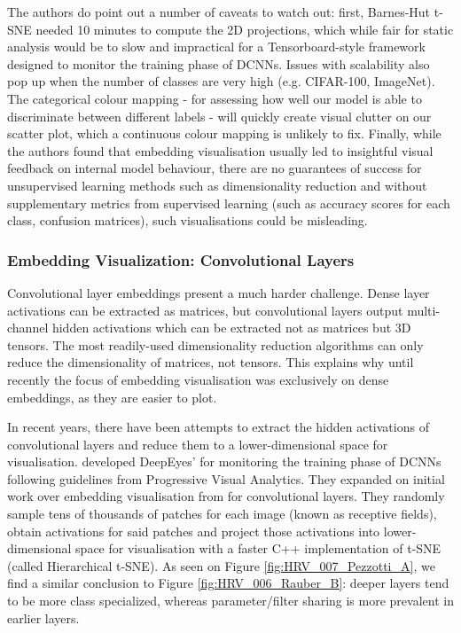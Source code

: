 The authors do point out a number of caveats to watch out: first, Barnes-Hut t-SNE needed 10 minutes to compute the 2D projections, which while fair for static analysis would be to slow and impractical for a Tensorboard-style framework designed to monitor the training phase of DCNNs. Issues with scalability also pop up when the number of classes are very high (e.g. CIFAR-100, ImageNet). The categorical colour mapping - for assessing how well our model is able to discriminate between different labels - will quickly create visual clutter on our scatter plot, which a continuous colour mapping is unlikely to fix. Finally, while the authors found that embedding visualisation usually led to insightful visual feedback on internal model behaviour, there are no guarantees of success for unsupervised learning methods such as dimensionality reduction and without supplementary metrics from supervised learning (such as accuracy scores for each class, confusion matrices), such visualisations could be misleading.

\subsubsection{Embedding Visualization: Convolutional Layers}
\label{embeddings-convolutional}

Convolutional layer embeddings present a much harder challenge. Dense layer activations can be extracted as matrices, but convolutional layers output multi-channel hidden activations which can be extracted not as matrices but 3D tensors. The most readily-used dimensionality reduction algorithms can only reduce the dimensionality of matrices, not tensors. This explains why until recently the focus of embedding visualisation was exclusively on dense embeddings, as they are easier to plot.

In recent years, there have been attempts to extract the hidden activations of convolutional layers and reduce them to a lower-dimensional space for visualisation. \cite{Pezzotti2018DeepEyesPV} developed DeepEyes' for monitoring the training phase of DCNNs following guidelines from Progressive Visual Analytics. They expanded on initial work over embedding visualisation from \cite{Rauber2017VisualizingTH} for convolutional layers. They randomly sample tens of thousands of patches for each image (known as receptive fields), obtain activations for said patches and project those activations into lower-dimensional space for visualisation with a faster C++ implementation of t-SNE (called Hierarchical t-SNE). As seen on Figure \ref{fig:HRV_007_Pezzotti_A}, we find a similar conclusion to Figure \ref{fig:HRV_006_Rauber_B}: deeper layers tend to be more class specialized, whereas parameter/filter sharing is more prevalent in earlier layers.

